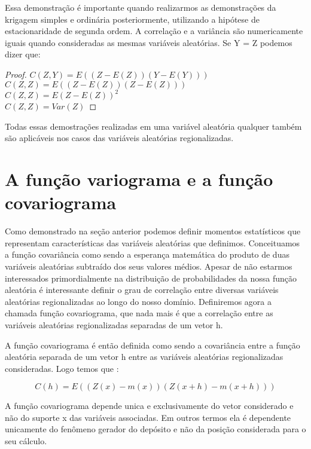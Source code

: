 Essa demonstração é importante quando realizarmos as demonstrações da krigagem simples e ordinária posteriormente, utilizando a hipótese de estacionaridade de segunda ordem. A correlação e a variância são numericamente iguais quando consideradas as mesmas variáveis aleatórias. Se Y = Z podemos dizer que:

\begin{proof}
$ C\left(Z,Y\right) = E\left( (Z-E(Z)) (Y-E(Y)) \right) $
\\$C\left(Z,Z\right) = E\left( (Z-E(Z))(Z-E(Z)) \right)$
\\$C\left(Z,Z\right) = E\left( Z-E(Z) \right)^2$
\\$C\left(Z,Z\right) = Var(Z)$
\end{proof}

Todas essas demostrações realizadas em uma variável aleatória qualquer também são aplicáveis nos casos das variáveis aleatórias regionalizadas. 

\section{A função variograma e a função covariograma}

Como demonstrado na seção anterior podemos definir momentos estatísticos que representam características das variáveis aleatórias que definimos. Conceituamos a função covariância como sendo a esperança matemática do produto de duas variáveis aleatórias subtraído dos seus valores médios. Apesar de não estarmos interessados primordialmente na distribuição de probabilidades da nossa função aleatória é interessante definir o grau de correlação entre diversas variáveis aleatórias regionalizadas ao longo do nosso domínio. Definiremos agora a chamada função covariograma, que nada mais é que a correlação entre as variáveis aleatórias regionalizadas separadas de um vetor h.  

A função covariograma é então definida como sendo a covariância entre a função aleatória separada de um vetor h entre as variáveis aleatórias regionalizadas consideradas. Logo temos que : 

\begin{equation}\label{eq6:Covariograma}
C\left(h\right)= E\left( (Z(x)-m(x)) (Z(x+h)-m(x+h)) \right)
\end{equation}

 A função covariograma depende unica e exclusivamente do vetor considerado e não do suporte x das variáveis associadas. Em outros termos ela é dependente unicamente do fenômeno gerador do depósito e não da posição considerada para o seu cálculo. 

